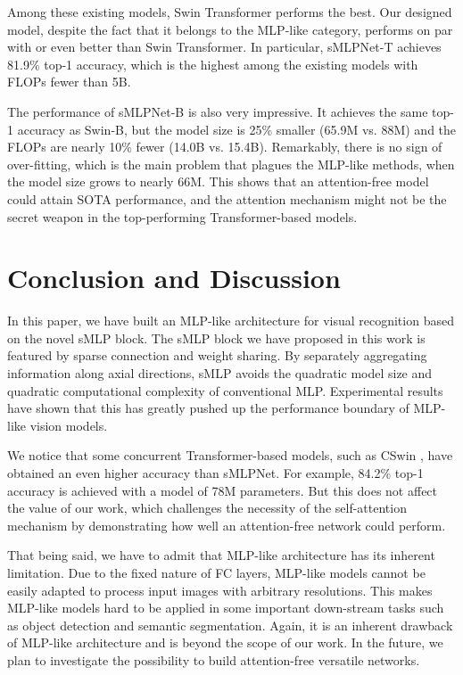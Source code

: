 \documentclass[letterpaper]{article} \usepackage{aaai22}  \usepackage{times}  \usepackage{helvet}  \usepackage{courier}  \usepackage[hyphens]{url}  \usepackage{graphicx} \usepackage{color}
\begin{document}
Among these existing models, Swin Transformer performs the best. Our designed model, despite the fact that it belongs to the MLP-like category, performs on par with or even better than Swin Transformer. In particular, sMLPNet-T achieves 81.9\% top-1 accuracy, which is the highest among the existing models with FLOPs fewer than 5B. 

The performance of sMLPNet-B is also very impressive. It achieves the same top-1 accuracy as Swin-B, but the model size is 25\% smaller (65.9M vs. 88M) and the FLOPs are nearly 10\% fewer (14.0B vs. 15.4B). Remarkably, there is no sign of over-fitting, which is the main problem that plagues the MLP-like methods, when the model size grows to nearly 66M. This shows that an attention-free model could attain SOTA performance, and the attention mechanism might not be the secret weapon in the top-performing Transformer-based models. 











\section{Conclusion and Discussion}
In this paper, we have built an MLP-like architecture for visual recognition based on the novel sMLP block. The sMLP block we have proposed in this work is featured by sparse connection and weight sharing. By separately aggregating information along axial directions, sMLP avoids the quadratic model size and quadratic computational complexity of conventional MLP. Experimental results have shown that this has greatly pushed up the performance boundary of MLP-like vision models.

We notice that some concurrent Transformer-based models, such as CSwin \cite{dong2021cswin}, have obtained an even higher accuracy than sMLPNet. For example, 84.2\% top-1 accuracy is achieved with a model of 78M parameters. But this does not affect the value of our work, which challenges the necessity of the self-attention mechanism by demonstrating how well an attention-free network could perform. 

That being said, we have to admit that MLP-like architecture has its inherent limitation. Due to the fixed nature of FC layers, MLP-like models cannot be easily adapted to process input images with arbitrary resolutions. This makes MLP-like models hard to be applied in some important down-stream tasks such as object detection and semantic segmentation. Again, it is an inherent drawback of MLP-like architecture and is beyond the scope of our work. In the future, we plan to investigate the possibility to build attention-free versatile networks. 







\appendix
\label{sec:reference_examples}

\nobibliography*

\end{document}
